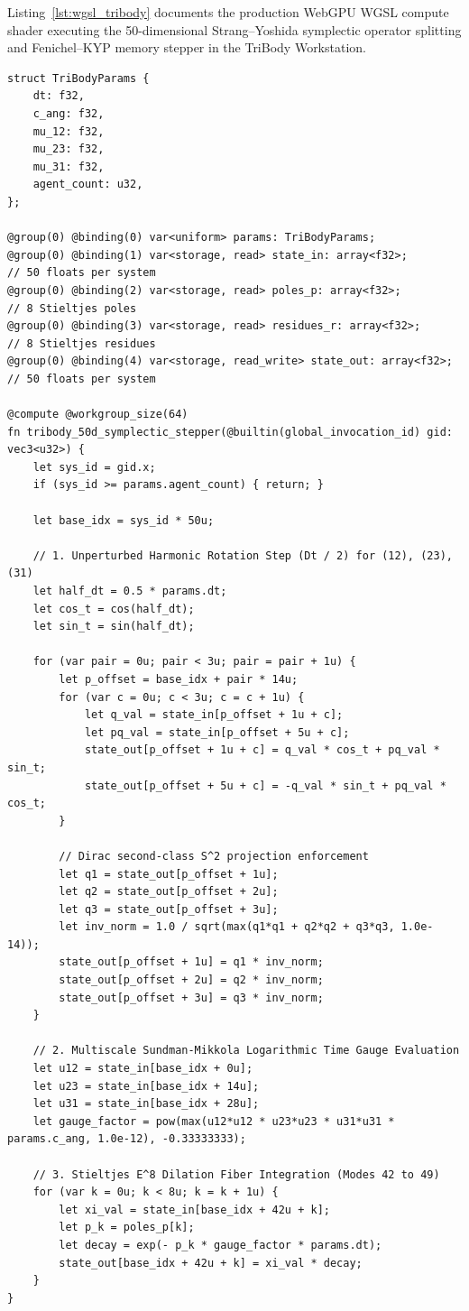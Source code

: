 \documentclass[11pt,a4paper,reqno]{article}
\theoremstyle{plain}
\theoremstyle{definition}
\theoremstyle{remark}
\numberwithin{equation}{section}
\begin{document}
Listing~\ref{lst:wgsl_tribody} documents the production WebGPU WGSL compute shader executing the 50-dimensional Strang--Yoshida symplectic operator splitting and Fenichel--KYP memory stepper in the TriBody Workstation.

\begin{lstlisting}[style=puristkernel, caption={Production WebGPU WGSL Compute Shader for 50-Dimensional Relativistic Three-Body Symplectic Regularization on $\mathcal{E}^{50}_{\mathrm{3Body}}$.}, label={lst:wgsl_tribody}]
struct TriBodyParams {
    dt: f32,
    c_ang: f32,
    mu_12: f32,
    mu_23: f32,
    mu_31: f32,
    agent_count: u32,
};

@group(0) @binding(0) var<uniform> params: TriBodyParams;
@group(0) @binding(1) var<storage, read> state_in: array<f32>;        // 50 floats per system
@group(0) @binding(2) var<storage, read> poles_p: array<f32>;         // 8 Stieltjes poles
@group(0) @binding(3) var<storage, read> residues_r: array<f32>;      // 8 Stieltjes residues
@group(0) @binding(4) var<storage, read_write> state_out: array<f32>; // 50 floats per system

@compute @workgroup_size(64)
fn tribody_50d_symplectic_stepper(@builtin(global_invocation_id) gid: vec3<u32>) {
    let sys_id = gid.x;
    if (sys_id >= params.agent_count) { return; }

    let base_idx = sys_id * 50u;

    // 1. Unperturbed Harmonic Rotation Step (Dt / 2) for (12), (23), (31)
    let half_dt = 0.5 * params.dt;
    let cos_t = cos(half_dt);
    let sin_t = sin(half_dt);

    for (var pair = 0u; pair < 3u; pair = pair + 1u) {
        let p_offset = base_idx + pair * 14u;
        for (var c = 0u; c < 3u; c = c + 1u) {
            let q_val = state_in[p_offset + 1u + c];
            let pq_val = state_in[p_offset + 5u + c];
            state_out[p_offset + 1u + c] = q_val * cos_t + pq_val * sin_t;
            state_out[p_offset + 5u + c] = -q_val * sin_t + pq_val * cos_t;
        }

        // Dirac second-class S^2 projection enforcement
        let q1 = state_out[p_offset + 1u];
        let q2 = state_out[p_offset + 2u];
        let q3 = state_out[p_offset + 3u];
        let inv_norm = 1.0 / sqrt(max(q1*q1 + q2*q2 + q3*q3, 1.0e-14));
        state_out[p_offset + 1u] = q1 * inv_norm;
        state_out[p_offset + 2u] = q2 * inv_norm;
        state_out[p_offset + 3u] = q3 * inv_norm;
    }

    // 2. Multiscale Sundman-Mikkola Logarithmic Time Gauge Evaluation
    let u12 = state_in[base_idx + 0u];
    let u23 = state_in[base_idx + 14u];
    let u31 = state_in[base_idx + 28u];
    let gauge_factor = pow(max(u12*u12 * u23*u23 * u31*u31 * params.c_ang, 1.0e-12), -0.33333333);

    // 3. Stieltjes E^8 Dilation Fiber Integration (Modes 42 to 49)
    for (var k = 0u; k < 8u; k = k + 1u) {
        let xi_val = state_in[base_idx + 42u + k];
        let p_k = poles_p[k];
        let decay = exp(- p_k * gauge_factor * params.dt);
        state_out[base_idx + 42u + k] = xi_val * decay;
    }
}
\end{lstlisting}
\end{document}
